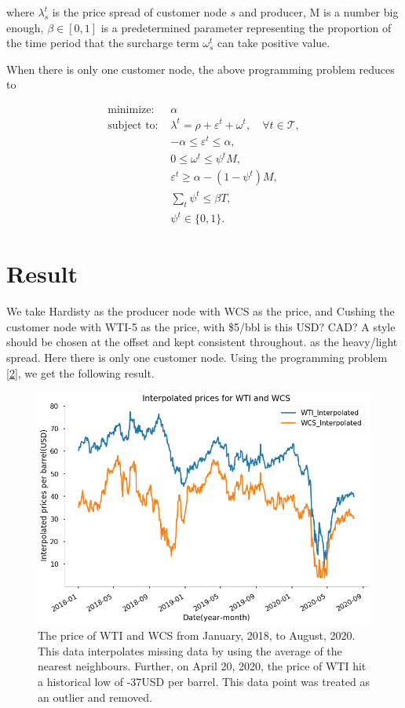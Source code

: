 \documentclass[11pt]{m2pi}
\newcommand{\cT}{\mathcal{T}}
\newcommand{\ves}{\varepsilon}
\begin{document}
where $\lambda_{s}^{t}$ is the price spread of customer node $s$ and producer, M is a number big enough, $\beta\in[0,1]$ is a predetermined parameter representing the proportion of the time period that the surcharge term $\omega_s^t$ can take positive value.

When there is only one customer node, the above programming problem reduces to

\begin{align}
\text{minimize: } &\alpha\\\label{2} \nonumber
\text{subject to: } &\lambda^t = \rho + \ves^t +\omega^t, \quad \forall t\in\cT,\\\nonumber
&-\alpha\leq\ves^t \leq \alpha,\\\nonumber
&0\leq\omega^t\leq \psi^t M,\\\nonumber
&\ves^t \geq \alpha - (1-\psi^t) M,\\ \nonumber
&\sum_t \psi^t \leq \beta T,\\\nonumber
&\psi^t \in\{0,1\}.\nonumber
\end{align}


\section{Result}
We take Hardisty as the producer node with WCS as the price, and Cushing the customer node with WTI-5 as the price, with \$5/bbl {\color{red} is this USD? CAD? A style should be chosen at the offset and kept consistent throughout.} as the heavy/light spread. Here there is only one customer node. Using the programming problem \eqref{2}, we get the following result.

\begin{figure}
    \centering
    \includegraphics[width = \linewidth]{Interpolated prices for WTI and WCS.png}
    \caption{The price of WTI and WCS from January, 2018, to August, 2020. This data interpolates missing data by using the average of the nearest neighbours. Further, on April 20, 2020, the price of WTI hit a historical low of -37USD per barrel. This data point was treated as an outlier and removed.}
    \label{fig:my_label}
\end{figure}
\end{document}
